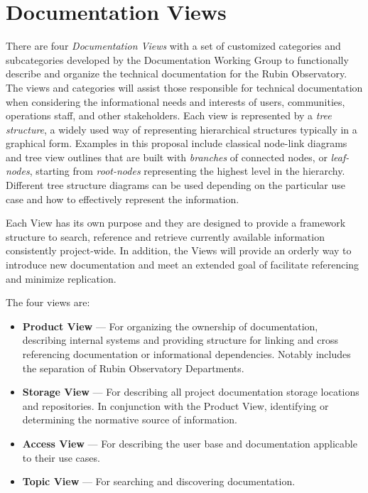 \section{Documentation Views}
\label{sec:views}

There are four \emph{Documentation Views} with a set of customized categories and subcategories developed by the Documentation Working Group to functionally describe and organize the technical documentation for the Rubin Observatory.
The views and categories will assist those responsible for technical documentation when considering the informational needs and interests of users, communities, operations staff, and other stakeholders.
Each view is represented by a \emph{tree structure}, a widely used way of representing hierarchical structures typically in a graphical form.
Examples in this proposal include classical node-link diagrams and tree view outlines that are built with \emph{branches} of connected nodes, or \emph{leaf-nodes}, starting from \emph{root-nodes} representing the highest level in the hierarchy.
Different tree structure diagrams can be used depending on the particular use case and how to effectively represent the information.
\citep{wiki-tree-diagram-cite}

Each View has its own purpose and they are designed to provide a framework structure to search, reference and retrieve currently available information consistently project-wide.
In addition, the Views will provide an orderly way to introduce new documentation and meet an extended goal of facilitate referencing and minimize replication.

The four views are:

\begin{itemize}

  \item \textbf{Product View} --- For organizing the ownership of documentation, describing internal systems and providing structure for linking and cross referencing documentation or informational dependencies.
  Notably includes the separation of Rubin Observatory Departments.

  \item \textbf{Storage View} --- For describing all project documentation storage locations and repositories.
  In conjunction with the Product View, identifying or determining the normative source of information.

  \item \textbf{Access View} --- For describing the user base and documentation applicable to their use cases.

  \item \textbf{Topic View} --- For searching and discovering documentation.

\end{itemize}

